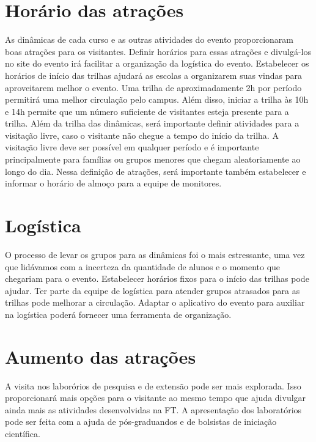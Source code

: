 \documentclass[
  letterpaper,
  DIV=11,
  numbers=noendperiod]{scrreprt}
\begin{document}
\section{Horário das atrações}\label{horuxe1rio-das-atrauxe7uxf5es}

As dinâmicas de cada curso e as outras atividades do evento
proporcionaram boas atrações para os visitantes. Definir horários para
essas atrações e divulgá-los no site do evento irá facilitar a
organização da logística do evento. Estabelecer os horários de início
das trilhas ajudará as escolas a organizarem suas vindas para
aproveitarem melhor o evento. Uma trilha de aproximadamente 2h por
período permitirá uma melhor circulação pelo campus. Além disso, iniciar
a trilha às 10h e 14h permite que um número suficiente de visitantes
esteja presente para a trilha. Além da trilha das dinâmicas, será
importante definir atividades para a visitação livre, caso o visitante
não chegue a tempo do início da trilha. A visitação livre deve ser
possível em qualquer período e é importante principalmente para famílias
ou grupos menores que chegam aleatoriamente ao longo do dia. Nessa
definição de atrações, será importante também estabelecer e informar o
horário de almoço para a equipe de monitores.

\section{Logística}\label{loguxedstica}

O processo de levar os grupos para as dinâmicas foi o mais estressante,
uma vez que lidávamos com a incerteza da quantidade de alunos e o
momento que chegariam para o evento. Estabelecer horários fixos para o
início das trilhas pode ajudar. Ter parte da equipe de logística para
atender grupos atrasados para as trilhas pode melhorar a circulação.
Adaptar o aplicativo do evento para auxiliar na logística poderá
fornecer uma ferramenta de organização.

\section{Aumento das atrações}\label{aumento-das-atrauxe7uxf5es}

A visita nos laborórios de pesquisa e de extensão pode ser mais
explorada. Isso proporcionará mais opções para o visitante ao mesmo
tempo que ajuda divulgar ainda mais as atividades desenvolvidas na FT. A
apresentação dos laboratórios pode ser feita com a ajuda de
pós-graduandos e de bolsistas de iniciação científica.
\end{document}
